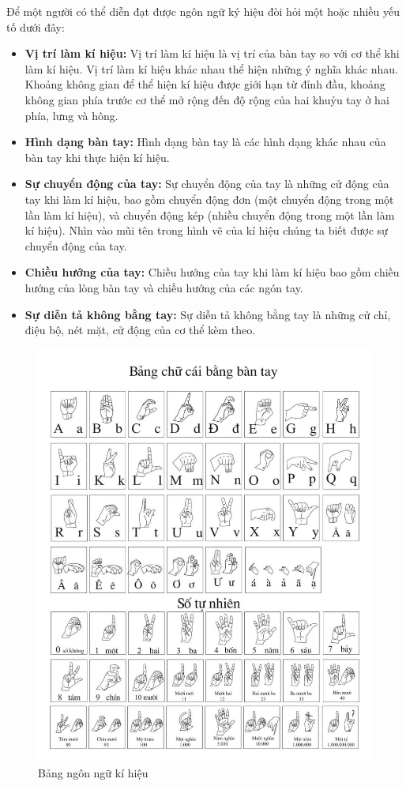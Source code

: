 \indent Để một người có thể diễn đạt được ngôn ngữ ký hiệu đòi hỏi một hoặc nhiều yếu tố dưới đây:
\begin{itemize}
    \item \textbf{Vị trí làm kí hiệu:} Vị trí làm kí hiệu là vị trí của bàn tay so với cơ thể khi làm kí hiệu. Vị trí làm kí hiệu khác nhau thể hiện những ý nghĩa khác nhau. Khoảng không gian để thể hiện kí hiệu được giới hạn từ đỉnh đầu, khoảng không gian phía trước cơ thể mở rộng đến độ rộng của hai khuỷu tay ở hai phía, lưng và hông.
    \item  \textbf{Hình dạng bàn tay:} Hình dạng bàn tay là các hình dạng khác nhau của bàn tay khi thực hiện kí hiệu.
    \item \textbf{Sự chuyển động của tay:} Sự chuyển động của tay là những cử động của tay khi làm kí hiệu, bao gồm chuyển động đơn (một chuyển động trong một lần làm kí hiệu), và chuyển động kép (nhiều chuyển động trong một lần làm kí hiệu). Nhìn vào mũi tên trong hình vẽ của kí hiệu chúng ta biết được sự chuyển động của tay.
    \item \textbf{Chiều hướng của tay:} Chiều hướng của tay khi làm kí hiệu bao gồm chiều hướng của lòng bàn tay và chiều hướng của các ngón tay.
    \item \textbf{Sự diễn tả không bằng tay:} Sự diễn tả không bằng tay là những cử chỉ, điệu bộ, nét mặt, cử động của cơ thể kèm theo.
\end{itemize}
\begin{figure}[H]
    \centering
    \includegraphics[width=\textwidth,height=\textheight,keepaspectratio]{Images/Theoretical basis/bangsochu.jpg}
    \caption{Bảng ngôn ngữ kí hiệu}
    \label{fig:enter-label}
\end{figure}


